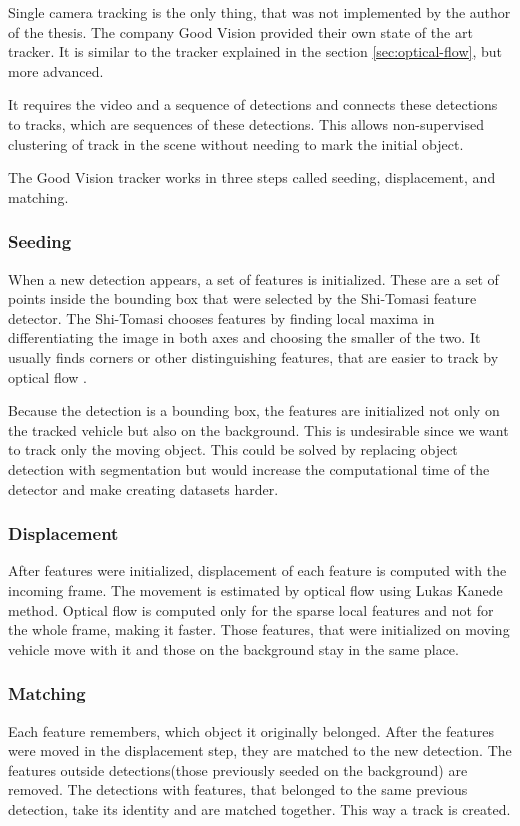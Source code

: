 \documentclass[a4paper,11pt,titlepage,twoside]{article}
\numberwithin{figure}{section}
\begin{document}
Single camera tracking is the only thing, that was not implemented by the author of the thesis. The company Good Vision provided their own state of the art tracker. It is similar to the tracker explained in the section \ref{sec:optical-flow}, but more advanced.

It requires the video and a sequence of detections and connects these detections to tracks, which are sequences of these detections. This allows non-supervised clustering of track in the scene without needing to mark the initial object. 

The Good Vision tracker works in three steps called seeding, displacement, and matching. 

\subsubsection{Seeding}
When a new detection appears, a set of features is initialized. These are a set of points inside the bounding box that were selected by the Shi-Tomasi \cite{shi-tomasi} feature detector. The Shi-Tomasi chooses features by finding local maxima in differentiating the image in both axes and choosing the smaller of the two. It usually finds corners or other distinguishing features, that are easier to track by optical flow \cite{optical-flow}. 

Because the detection is a bounding box, the features are initialized not only on the tracked vehicle but also on the background. This is undesirable since we want to track only the moving object. This could be solved by replacing object detection with segmentation but would increase the computational time of the detector and make creating datasets harder.

\subsubsection{Displacement}
After features were initialized, displacement of each feature is computed with the incoming frame. The movement is estimated by optical flow using Lukas Kanede \cite{lucas-kanede} method. Optical flow is computed only for the sparse local features and not for the whole frame, making it faster. Those features, that were initialized on moving vehicle move with it and those on the background stay in the same place. 

\subsubsection{Matching}
Each feature remembers, which object it originally belonged. After the features were moved in the displacement step, they are matched to the new detection. The features outside detections(those previously seeded on the background) are removed. The detections with features, that belonged to the same previous detection, take its identity and are matched together. This way a track is created.
\end{document}
